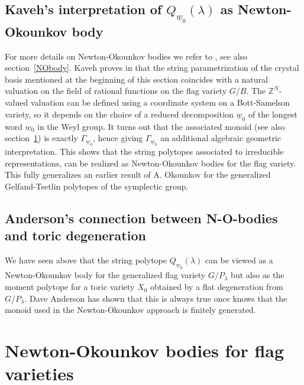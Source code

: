 \documentclass{emsprocart}
\theoremstyle{definition}
\begin{document}
\subsection{Kaveh's interpretation of \texorpdfstring{$Q_{\underline{w}_0}(\lambda)$}{the string polytopes} as Newton-Okounkov body} For more
details on Newton-Okounkov bodies we refer to \cite{KK}, see also section~\ref{NObody}. 
Kaveh proves in \cite{K1} that the string
parametrization of the crystal basis mentioned at the beginning of this section
coincides with a natural valuation on the field of rational functions on the flag variety $G/B$.
The $\mathbb Z^N$-valued valuation can be defined using a coordinate system on a Bott-Samelson variety,
so it depends on the choice of a reduced decomposition ${\underline{w}_0}$ of the longest word $w_0$
in the Weyl group. It turns out that the associated monoid (see also section~\ref{Section:birational}) is exactly ${\Gamma}_{{\underline{w}_0}}$,
hence giving ${\Gamma}_{{\underline{w}_0}}$ an additional algebraic geometric interpretation.
This shows that the string polytopes associated to irreducible representations, can be realized as
Newton-Okounkov bodies for the flag variety. This fully generalizes an earlier result of
A. Okounkov \cite{O} for the generalized Gelfand-Tsetlin polytopes of the symplectic group.

\subsection{Anderson's connection between N-O-bodies and toric degeneration}\label{AndersonNO}
We have seen above that the string polytope $Q_{\underline{w}_0}(\lambda)$ can be viewed as a 
Newton-Okounkov body for the generalized flag variety $G/P_\lambda$ but also as the moment 
polytope for a toric variety $X_0$ obtained by a flat degeneration from $G/P_\lambda$. Dave Anderson \cite{A} has shown 
that this is always true once knows that the monoid used in the Newton-Okounkov approach is finitely generated.

\section{Newton-Okounkov bodies for flag varieties}\label{Section:birational}
\end{document}
